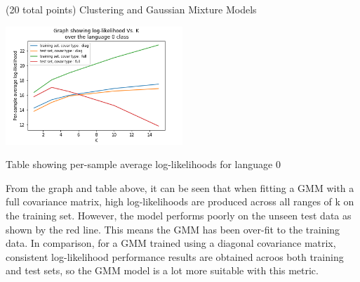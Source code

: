 \documentclass[12pt]{article}
\begin{document}
\begin{question}{(20 total points) Clustering and Gaussian Mixture Models}
\begin{subquestion}
      \begin{answerbox}{30em}
         \includegraphics[width = 0.5\textwidth]{q3_5.png}
         \begin{center}
        \caption{Table showing per-sample average log-likelihoods for language 0}\newline
        \end{center}
        From the graph and table above, it can be seen that when fitting a GMM with a full covariance matrix, high log-likelihoods are produced across all ranges of k on the training set. However, the model performs poorly on the unseen test data as shown by the red line. This means the GMM has been over-fit to the training data. In comparison, for a GMM trained using a diagonal covariance matrix, consistent log-likelihood performance results are obtained acroos both training and test sets, so the GMM model is a lot more suitable with this metric.
      \end{answerbox}
  


   \end{subquestion}

   
\end{question}
\end{document}
